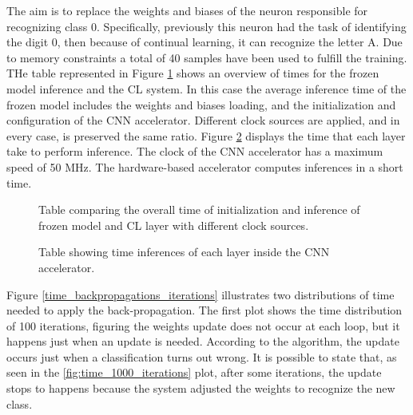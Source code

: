 \quad The aim is to replace the weights and biases of the neuron responsible for recognizing class 0. Specifically, previously this neuron had the task of identifying the digit 0, then because of continual learning, it can recognize the letter A. Due to memory constraints a total of 40 samples have been used to fulfill the training. THe table represented in Figure \ref{time_inferences} shows an overview of times for the frozen model inference and the CL system. In this case the average inference time of the frozen model includes the weights and biases loading, and the initialization and configuration of the CNN accelerator. Different clock sources are applied, and in every case, is preserved the same ratio. Figure \ref{time_single_layer} displays the time that each layer take to perform inference. The clock of the CNN accelerator has a maximum speed of 50 MHz. The hardware-based accelerator computes inferences in a short time. 

\begin{figure}[!ht]
\centerline{}
\caption{Table comparing the overall time of initialization and inference of frozen model and CL layer with different clock sources.}
\label{time_inferences}
\end{figure}

\begin{figure}[htbp]
\centerline{}
\caption{Table showing time inferences of each layer inside the CNN accelerator.}
\label{time_single_layer}
\end{figure}

\singlespacing

\quad Figure \ref{time_backpropagations_iterations} illustrates two distributions of time needed to apply the back-propagation. The first plot shows the time distribution of 100 iterations, figuring the weights update does not occur at each loop, but it happens just when an update is needed. According to the algorithm, the update occurs just when a classification turns out wrong. It is possible to state that, as seen in the \ref{fig:time_1000_iterations} plot, after some iterations, the update stops to happens because the system adjusted the weights to recognize the new class.

